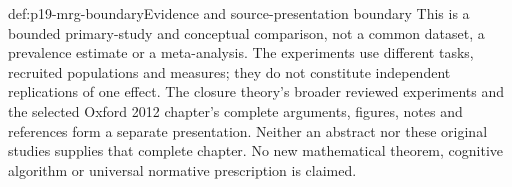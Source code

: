\begin{proofboundary}{def:p19-mrg-boundary}{Evidence and source-presentation boundary}
This is a bounded primary-study and conceptual comparison, not a common
dataset, a prevalence estimate or a meta-analysis. The experiments use
different tasks, recruited populations and measures; they do not constitute
independent replications of one effect. The closure theory's broader
reviewed experiments and the selected Oxford 2012 chapter's complete
arguments, figures, notes and references form a separate presentation.
Neither an abstract nor these original studies supplies that complete
chapter. No new mathematical theorem, cognitive algorithm or universal
normative prescription is claimed.
\end{proofboundary}
